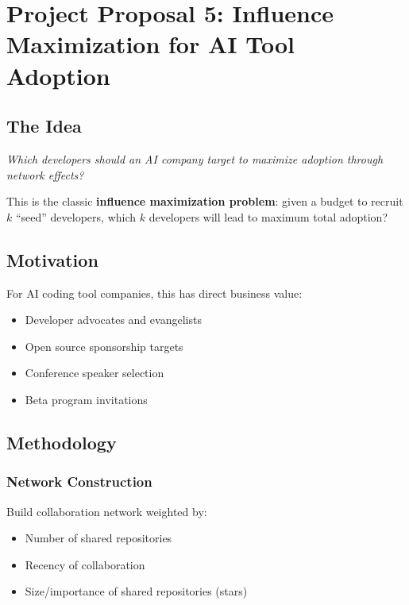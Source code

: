 \documentclass[11pt,letterpaper]{article}
\begin{document}
\section{Project Proposal 5: Influence Maximization for AI Tool Adoption}

\subsection{The Idea}

\begin{tcolorbox}[colback=purple!5,colframe=purple!75!black,title=Core Question]
\textit{Which developers should an AI company target to maximize adoption through network effects?}
\end{tcolorbox}

This is the classic \textbf{influence maximization problem}: given a budget to recruit $k$ ``seed'' developers, which $k$ developers will lead to maximum total adoption?

\subsection{Motivation}

For AI coding tool companies, this has direct business value:
\begin{itemize}
    \item Developer advocates and evangelists
    \item Open source sponsorship targets
    \item Conference speaker selection
    \item Beta program invitations
\end{itemize}

\subsection{Methodology}

\subsubsection{Network Construction}

Build collaboration network weighted by:
\begin{itemize}
    \item Number of shared repositories
    \item Recency of collaboration
    \item Size/importance of shared repositories (stars)
\end{itemize}
\end{document}

